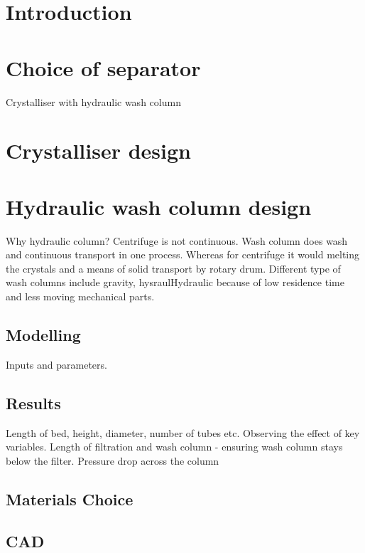 \section{Introduction}


\section{Choice of separator}
Crystalliser with hydraulic wash column 



\section{Crystalliser design}




\section{Hydraulic wash column design}
Why hydraulic column?
Centrifuge is not continuous. Wash column does wash and continuous transport in one process. Whereas for centrifuge it would  melting the crystals and a means of solid transport by rotary drum. Different type of wash columns include gravity, hysraulHydraulic because of low residence time and less moving mechanical parts. 

\subsection{Modelling}
Inputs and parameters. 



\subsection{Results}
Length of bed, height, diameter, number of tubes etc. Observing the effect of key variables. Length of filtration and wash column - ensuring wash column stays below the filter. Pressure drop across the column

\subsection{Materials Choice}

\subsection{CAD}

